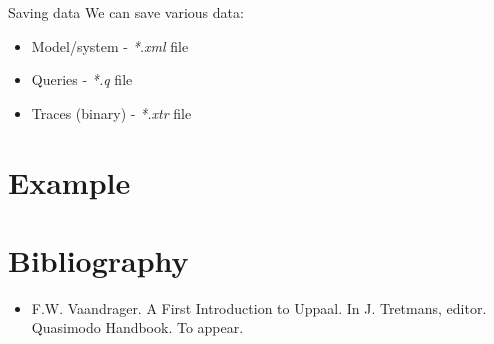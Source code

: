 \documentclass{beamer}
\begin{document}
\begin{frame}{Saving data}
	We can save various data:
	
	\begin{itemize}
		\item Model/system - \textit{*.xml} file
		\item Queries - \textit{*.q} file
		\item Traces (binary) - \textit{*.xtr} file
	\end{itemize}
\end{frame}

\section{Example}

\section{Bibliography}
\begin{itemize}
	\item F.W. Vaandrager. A First Introduction to Uppaal. In J. Tretmans, editor. Quasimodo Handbook. To appear.
\end{itemize}
\end{document}
